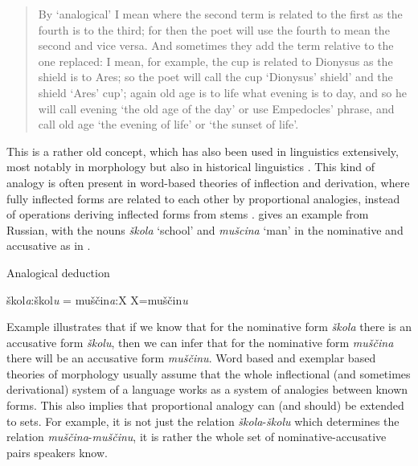 \begin{quotation}
  By `analogical' I mean where the second term is related to the first as the fourth is to the third; for then the poet will use the fourth to mean the second and vice versa. And sometimes they add the term relative to the one replaced: I mean, for example, the cup is related to Dionysus as the shield is to Ares; so the poet will call the cup `Dionysus' shield' and the shield `Ares' cup'; again old age is to life what evening is to day, and so he will call evening `the old age of the day' or use Empedocles' phrase, and call old age `the evening of life' or `the sunset of life'. \autocite[Chapter III]{Russell.1989}
\end{quotation}


This is a rather old concept, which has also been used in linguistics extensively, most notably in morphology but also in historical linguistics \autocite{Paul.1995}. This kind of analogy is often present in word-based theories of inflection and derivation, where fully inflected forms are related to each other by proportional analogies, instead of operations deriving inflected forms from stems \autocites{Blevins.2006a, Blevins.2008, Blevins.2016a}. \textcite[543]{Blevins.2006a} gives an example from Russian, with the nouns \textit{škola} `school' and \textit{mušcina} `man' in the nominative and accusative as in .

\begin{exe}
    \ex \label{exe-analogy-prop} Analogical deduction
    \begin{xlist}
        \ex škol\textit{a}:škol\textit{u} = muščin\textit{a}:X
        \ex X=muščin\textit{u}
    \end{xlist}
\end{exe}

Example  illustrates that if we know that for the nominative form \textit{škola} there is an accusative form \textit{školu}, then we can infer that for the nominative form \textit{muščina} there will be an accusative form \textit{muščinu}. Word based and exemplar based theories of morphology usually assume that the whole inflectional (and sometimes derivational) system of a language works as a system of analogies between known forms. This also implies that proportional analogy can (and should) be extended to sets. For example, it is not just the relation \textit{škola}-\textit{školu} which determines the relation \textit{muščina}-\textit{muščinu}, it is rather the whole set of nominative-accusative pairs speakers know.


